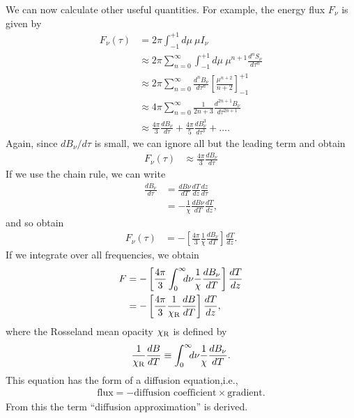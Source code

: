 We can now calculate other useful quantities. For example, the energy flux $F_\nu$ is given by
\begin{align}
F_\nu(\tau) 
&= 
2\pi \int_{-1}^{+1}\!\!\!d\mu\:\mu I_\nu\\
&\approx 
2\pi
\sum_{n=0}^\infty \int_{-1}^{+1}\!\!\!d\mu\:\mu^{n+1}
 \frac{d^n\!S_\nu}{d\tau^n}\\
&\approx 
2\pi
\sum_{n=0}^\infty \frac{d^n\!B_\nu}{d\tau^n}
\left[\frac{\mu^{n+2}}{n + 2}\right]_{-1}^{+1}\\
&\approx
4\pi \sum_{n=0}^\infty \frac{1}{2n + 3} \frac{d^{2n+1}B_\nu}{d\tau^{2n+1}}\\
&\approx
\frac{4\pi}{3} \frac{dB_\nu}{d\tau} + \frac{4\pi}{5} \frac{dB^3_\nu}{d\tau^3} + \ldots.
\end{align}
Again, since $dB_\nu/d\tau$ is small, we can ignore all but the leading term and obtain
\begin{align}
F_\nu(\tau) 
&\approx
\frac{4\pi}{3} \frac{dB_\nu}{d\tau} 
\end{align}
If we use the chain rule, we can write
\begin{align}
\frac{dB_\nu}{d\tau}
&=
\frac{dB\nu}{dT}\frac{dT}{dz}\frac{dz}{d\tau}\\
&= - \frac{1}{\chi} \frac{dB\nu}{dT} \frac{dT}{dz},
\end{align}
and so obtain
\begin{align}
F_\nu(\tau)
&=
-\left[\frac{4\pi}{3} \frac{1}{\chi} \frac{dB_\nu}{dT}\right]\frac{dT}{dz} .
\end{align}
If we integrate over all frequencies, we obtain
\begin{align}
F 
&=
-
\left[
\frac{4\pi}{3} \int_0^\infty\!\!\!d\nu \frac{1}{\chi} \frac{dB_\nu}{dT}\right]
\frac{dT}{dz} \\
&= -\left[\frac{4\pi}{3} \frac{1}{\chi_\mathrm{R}} \frac{dB}{dT}\right]\frac{dT}{dz},
\end{align}
where the Rosseland mean opacity $\chi_\mathrm{R}$ is
defined by
\begin{align}
\frac{1}{\chi_\mathrm{R}} \frac{dB}{dT}
\equiv 
\int_0^\infty\!\!\!d\nu \frac{1}{\chi} \frac{dB_\nu}{dT}.
\end{align}
This equation has the form of a diffusion equation,i.e.,
\begin{align}
\mbox{flux} = - \mbox{diffusion coefficient} \times
\mbox{gradient}.
\end{align}
From this the term ``diffusion approximation'' is derived.


